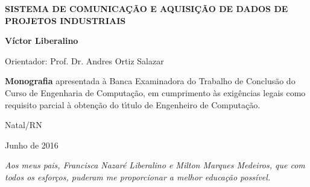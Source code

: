 %

\begin{titlepage}
%
\begin{center}
%

%
\Large \textbf{SISTEMA DE COMUNICAÇÃO E AQUISIÇÃO DE DADOS DE PROJETOS INDUSTRIAIS}


\vfill

\Large \textbf{Víctor Liberalino}

\bigskip
\bigskip
\bigskip
\bigskip

\normalsize

Orientador: Prof. Dr. Andres Ortiz Salazar

\vfill

\hfill
\parbox{0.5\linewidth}{
\textbf{Monografia}
apresentada \`{a} Banca Examinadora do Trabalho de Conclus\~{a}o do Curso de
Engenharia de Computa\c{c}\~{a}o, em cumprimento \`{a}s exig\^{e}ncias
legais como requisito parcial \`{a} obten\c{c}\~{a}o do t\'{\i}tulo de Engenheiro de
Computa\c{c}\~{a}o.}

\vfill

\large

Natal/RN

Junho de 2016

\end{center}
\end{titlepage}

%
%


\begin{titlepage}

\vspace*{\fill}

\hfill
\begin{minipage}{0.5\linewidth}
\begin{flushright}
\large\it
Aos meus pais, Francisca Nazaré Liberalino e Milton Marques Medeiros, que com todos os esforços, puderam me proporcionar a melhor educação possível.

\end{flushright}
\end{minipage}

\vspace*{\fill}

\end{titlepage}

